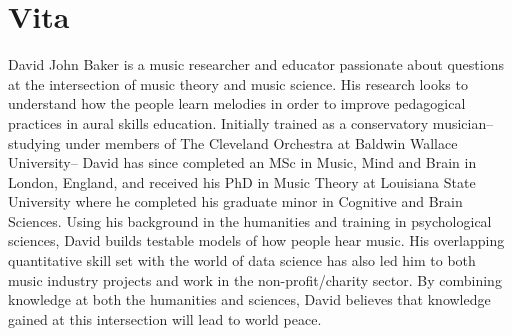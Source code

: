 \chapter{Vita}

David John Baker is a music researcher and educator passionate about questions at the intersection of music theory and music science.
His research looks to understand how the people learn melodies in order to improve pedagogical practices in aural skills education.
Initially trained as a conservatory musician-- studying under members of The Cleveland Orchestra at Baldwin Wallace University-- David has since completed an MSc in Music, Mind and Brain in London, England, and received his PhD in Music Theory at Louisiana State University where he completed his graduate minor in Cognitive and Brain Sciences.
Using his background in the humanities and training in psychological sciences, David builds testable models of how people hear music.
His overlapping quantitative skill set with the world of data science has also led him to both music industry projects and work in the non-profit/charity sector.
By combining knowledge at both the humanities and sciences, David believes that knowledge gained at this intersection will lead to world peace.






